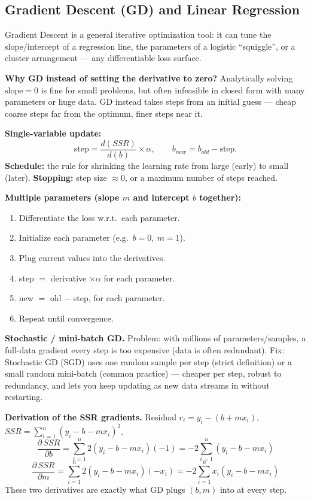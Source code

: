 \subsection{Gradient Descent (GD) and Linear Regression}

\begin{defbox}
Gradient Descent is a general iterative optimization tool: it can tune the slope/intercept of a regression line, the parameters of a logistic ``squiggle'', or a cluster arrangement — any differentiable loss surface.
\end{defbox}

\textbf{Why GD instead of setting the derivative to zero?} Analytically solving $\text{slope}=0$ is fine for small problems, but often infeasible in closed form with many parameters or huge data. GD instead takes steps from an initial guess — cheap coarse steps far from the optimum, finer steps near it.

\textbf{Single-variable update:}
\[
\text{step} = \frac{d(SSR)}{d(b)}\times \alpha, \qquad b_{new}=b_{old}-\text{step}.
\]
\textbf{Schedule:} the rule for shrinking the learning rate from large (early) to small (later).
\textbf{Stopping:} step size $\approx 0$, or a maximum number of steps reached.

\textbf{Multiple parameters (slope $m$ and intercept $b$ together):}
\begin{enumerate}
\item Differentiate the loss w.r.t.\ each parameter.
\item Initialize each parameter (e.g.\ $b{=}0,\ m{=}1$).
\item Plug current values into the derivatives.
\item step $=$ derivative $\times \alpha$ for each parameter.
\item new $=$ old $-$ step, for each parameter.
\item Repeat until convergence.
\end{enumerate}

\textbf{Stochastic / mini-batch GD.} Problem: with millions of parameters/samples, a full-data gradient every step is too expensive (data is often redundant). Fix: Stochastic GD (SGD) uses one random sample per step (strict definition) or a small random mini-batch (common practice) — cheaper per step, robust to redundancy, and lets you keep updating as new data streams in without restarting.

\begin{examplebox}
\textbf{Derivation of the SSR gradients.} Residual $r_i = y_i-(b+mx_i)$, $SSR=\sum_{i=1}^n(y_i-b-mx_i)^2$.
\[
\frac{\partial\,SSR}{\partial b} = \sum_{i=1}^n 2(y_i-b-mx_i)(-1) = -2\sum_{i=1}^n(y_i-b-mx_i)
\]
\[
\frac{\partial\,SSR}{\partial m} = \sum_{i=1}^n 2(y_i-b-mx_i)(-x_i) = -2\sum_{i=1}^n x_i(y_i-b-mx_i)
\]
These two derivatives are exactly what GD plugs $(b,m)$ into at every step.
\end{examplebox}

